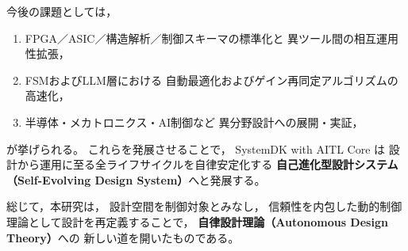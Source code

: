 今後の課題としては，
\begin{enumerate}
  \item FPGA／ASIC／構造解析／制御スキーマの標準化と
        異ツール間の相互運用性拡張，
  \item FSMおよびLLM層における
        自動最適化およびゲイン再同定アルゴリズムの高速化，
  \item 半導体・メカトロニクス・AI制御など
        異分野設計への展開・実証，
\end{enumerate}
が挙げられる。
これらを発展させることで，
SystemDK with AITL Core は
設計から運用に至る全ライフサイクルを自律安定化する
\textbf{自己進化型設計システム（Self-Evolving Design System）}へと発展する。

総じて，本研究は，
設計空間を制御対象とみなし，
信頼性を内包した動的制御理論として設計を再定義することで，
\textbf{自律設計理論（Autonomous Design Theory）}への
新しい道を開いたものである。
